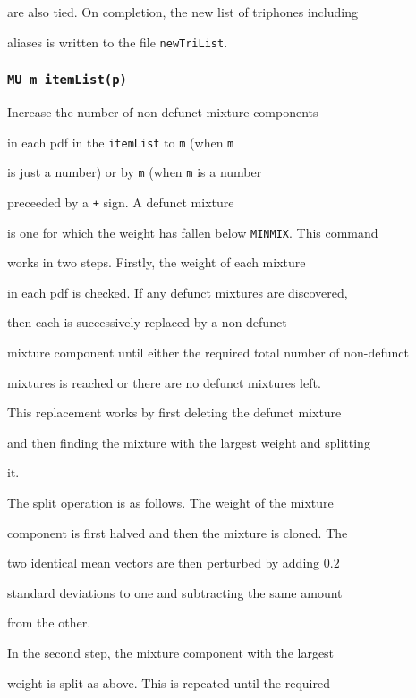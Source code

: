 are also tied.  On completion, the new list of triphones including


aliases is written to the file \texttt{newTriList}.





\subsubsection*{\tt MU m itemList(p)}





Increase the number of non-defunct mixture components


in each pdf in the \texttt{itemList} to \texttt{m} (when \texttt{m} 


is just a number) or by \texttt{m} (when \texttt{m} is a number 


preceeded by a \texttt{+} sign.  A defunct mixture


is one for which the weight has fallen below \texttt{MINMIX}. This command


works in two steps.  Firstly, the weight of each mixture


in each pdf is checked.  If any defunct mixtures are discovered, 


then each is successively replaced by a non-defunct


mixture component until either the required total number of non-defunct


mixtures is reached or there are no defunct mixtures left.


This replacement works by first deleting the defunct mixture


and then finding the mixture with the largest weight and splitting


it.


The split operation is as follows.  The weight of the mixture


component is first halved and then the mixture is cloned.  The


two identical mean vectors are then perturbed by adding $0.2$


standard deviations to one and subtracting the same amount


from the other.





In the second step, the mixture component with the largest


weight is split as above.  This is repeated until the required


